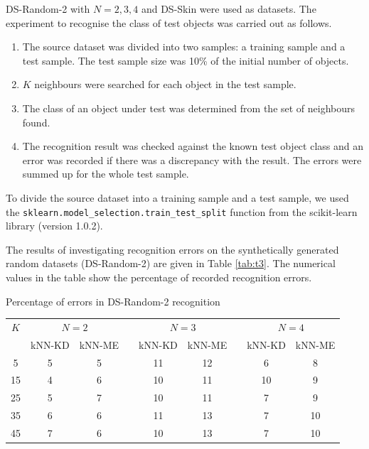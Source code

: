\documentclass[entropy,article,submit,moreauthors,pdftex]{Definitions/mdpi}
\begin{document}
\begin{paracol}{2}
DS-Random-2 with $N = 2, 3, 4$ and DS-Skin were used as datasets. The experiment to recognise the class of test objects was carried out as follows.

\begin{enumerate}
\item The source dataset was divided into two samples: a training sample and a test sample. The test sample size was 10\% of the initial number of objects.
\item $K$ neighbours were searched for each object in the test sample.
\item The class of an object under test was determined from the set of neighbours found.
\item The recognition result was checked against the known test object class and an error was recorded if there was a discrepancy with the result. The errors were summed up for the whole test sample.
\end{enumerate}

To divide the source dataset into a training sample and a test sample, we used the \texttt{sklearn.model\_selection.train\_test\_split} function from the scikit-learn library (version 1.0.2).

The results of investigating recognition errors on the synthetically generated random datasets (DS-Random-2) are given in Table \ref{tab:t3}. The numerical values in the table show the percentage of recorded recognition errors.

\begin{specialtable}[H] 
  \caption{Percentage of errors in DS-Random-2 recognition}\label{tab:t3}
	\center
	\begin{tabular}{ccccccccc}
\toprule
$K$ & \multicolumn{2}{c}{ $N=2$ } & & \multicolumn{2}{c}{$N=3$} & & \multicolumn{2}{c}{$N=4$} \\
		\noalign{\smallskip} \cline{2-3} \cline{5-6} \cline{8-9} \noalign{\smallskip}
  & kNN-KD & kNN-ME & & kNN-KD & kNN-ME & & kNN-KD & kNN-ME \\
\midrule													
5  & 5 & 5 & & 11 & 12 & & 6 & 8 \\
15 & 4 & 6 & & 10 & 11 & & 10 & 9 \\
25 & 5 & 7 & & 10 & 11 & & 7 & 9 \\
35 & 6 & 6 & & 11 & 13 & & 7 & 10 \\
45 & 7 & 6 & & 10 & 13 & & 7 & 10 \\
\bottomrule
\end{tabular}
\end{specialtable}


\end{paracol}
\end{document}

